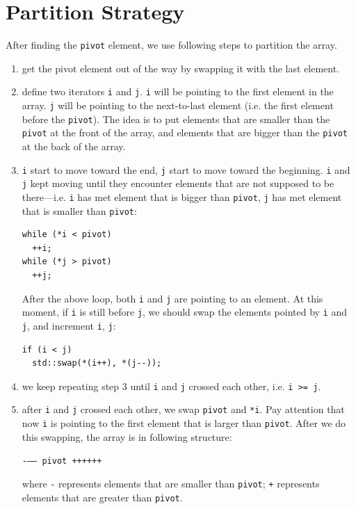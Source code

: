 \documentclass[11pt]{book}
\begin{document}
\section{Partition Strategy}
\label{sec:orge59d304}
After finding the \texttt{pivot} element, we use following steps to partition the array.
\begin{enumerate}
\item get the pivot element out of the way by swapping it with the last element.
\item define two iterators \texttt{i} and \texttt{j}. \texttt{i} will be pointing to the first element in the array. \texttt{j} will be pointing to the next-to-last element (i.e. the first element before the \texttt{pivot}). The idea is to put elements that are smaller than the \texttt{pivot} at the front of the array, and elements that are bigger than the \texttt{pivot} at the back of the array.
\item \texttt{i} start to move toward the end, \texttt{j} start to move toward the beginning. \texttt{i} and \texttt{j} kept moving until they encounter elements that are not supposed to be there---i.e. \texttt{i} has met element that is bigger than \texttt{pivot}, \texttt{j} has met element that is smaller than \texttt{pivot}:
\begin{verbatim}
while (*i < pivot)
  ++i;
while (*j > pivot)
  ++j;
\end{verbatim}
After the above loop, both \texttt{i} and \texttt{j} are pointing to an element. At this moment, if \texttt{i} is still before \texttt{j}, we should swap the elements pointed by \texttt{i} and \texttt{j}, and increment \texttt{i}, \texttt{j}:
\begin{verbatim}
if (i < j)
  std::swap(*(i++), *(j--));
\end{verbatim}
\item we keep repeating step 3 until \texttt{i} and \texttt{j} crossed each other, i.e. \texttt{i >= j}.
\item after \texttt{i} and \texttt{j} crossed each other, we swap \texttt{pivot} and \texttt{*i}. Pay attention that now \texttt{i} is pointing to the first element that is larger than \texttt{pivot}. After we do this swapping, the array is in following structure:

\texttt{-{}--{}-- pivot ++++++}

where \texttt{-} represents elements that are smaller than \texttt{pivot}; \texttt{+} represents elements that are greater than \texttt{pivot}.
\end{enumerate}
\end{document}
